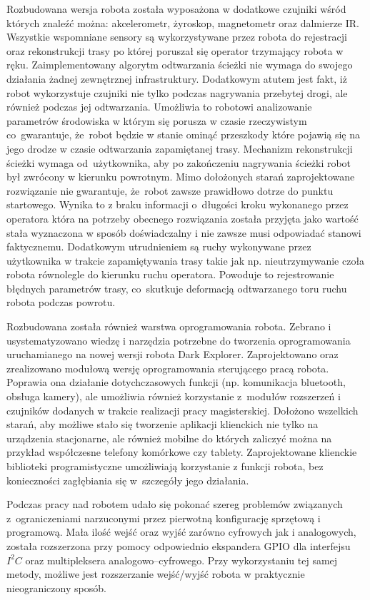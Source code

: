 Rozbudowana wersja robota została wyposażona w dodatkowe czujniki wśród których
znaleźć można: akcelerometr, żyroskop, magnetometr oraz dalmierze IR. Wszystkie
wspomniane sensory są wykorzystywane przez robota do rejestracji oraz
rekonstrukcji trasy po której poruszał się operator trzymający robota w ręku.
Zaimplementowany algorytm odtwarzania ścieżki nie wymaga do swojego działania
żadnej zewnętrznej infrastruktury. Dodatkowym atutem jest fakt, iż robot
wykorzystuje czujniki nie tylko podczas nagrywania przebytej drogi, ale również
podczas jej odtwarzania. Umożliwia to robotowi analizowanie parametrów środowiska
w którym się porusza w czasie rzeczywistym co~gwarantuje, że~robot będzie w
stanie ominąć przeszkody które pojawią się na jego drodze w czasie odtwarzania
zapamiętanej trasy. Mechanizm rekonstrukcji ścieżki wymaga od~użytkownika, aby po
zakończeniu nagrywania ścieżki robot był zwrócony w kierunku powrotnym. Mimo
dołożonych starań zaprojektowane rozwiązanie nie gwarantuje, że~robot zawsze
prawidłowo dotrze do punktu startowego. Wynika to z braku informacji o~długości
kroku wykonanego przez operatora która na potrzeby obecnego rozwiązania została
przyjęta jako wartość stała wyznaczona w sposób doświadczalny i nie zawsze musi
odpowiadać stanowi faktycznemu. Dodatkowym utrudnieniem są ruchy wykonywane przez
użytkownika w trakcie zapamiętywania trasy takie jak np. nieutrzymywanie czoła
robota równolegle do kierunku ruchu operatora. Powoduje to rejestrowanie błędnych
parametrów trasy, co~skutkuje deformacją odtwarzanego toru ruchu robota podczas
powrotu.

Rozbudowana została również warstwa oprogramowania robota. Zebrano i
usystematyzowano wiedzę i narzędzia potrzebne do tworzenia oprogramowania
uruchamianego na nowej wersji robota Dark Explorer. Zaprojektowano oraz
zrealizowano modułową wersję oprogramowania sterującego pracą
robota. Poprawia ona działanie dotychczasowych funkcji (np. komunikacja
bluetooth, obsługa kamery), ale umożliwia również korzystanie z~modułów
rozszerzeń i czujników dodanych w trakcie realizacji pracy magisterskiej.
Dołożono wszelkich starań, aby możliwe stało się tworzenie aplikacji klienckich nie tylko na
urządzenia stacjonarne, ale również mobilne do których zaliczyć można na
przykład współczesne telefony komórkowe czy tablety. Zaprojektowane
klienckie biblioteki programistyczne umożliwiają korzystanie z funkcji robota,
bez konieczności zagłębiania się w~szczegóły jego działania.

Podczas pracy nad robotem udało się pokonać szereg problemów związanych
z~ograniczeniami narzuconymi przez pierwotną konfigurację sprzętową i
programową. Mała ilość wejść oraz wyjść zarówno cyfrowych jak i analogowych, została rozszerzona przy
pomocy odpowiednio ekspandera GPIO dla interfejsu $I^{2}C$ oraz multipleksera
analogowo--cyfrowego. Przy wykorzystaniu tej samej metody, możliwe jest
rozszerzanie wejść/wyjść robota w praktycznie nieograniczony sposób. 

